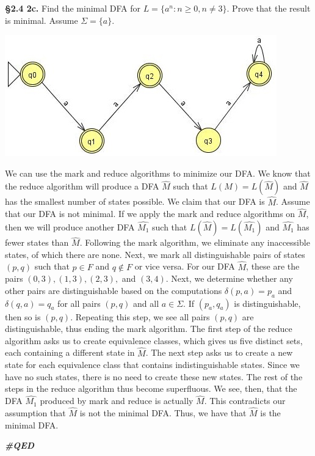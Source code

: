\documentclass[12pt,letter]{article}
\newcommand{\QED}{
	\begin{flushright}
		\textit{\textbf{\#QED}}
	\end{flushright}
}
\begin{document}
\pagebreak


\textbf{\S 2.4 2c.} Find the minimal DFA for $L = \lbrace a^n : n \geq 0, n \neq 3 \rbrace$. Prove that the result is minimal. Assume $\Sigma = \lbrace a \rbrace$.

\begin{center}
	\includegraphics{"images/Lab 2 - 2c"}
\end{center}

We can use the mark and reduce algorithms to minimize our DFA. We know that the reduce algorithm will produce a DFA $\widehat{M}$ such that $L(M) = L(\widehat{M})$ and $\widehat{M}$ has the smallest number of states possible. We claim that our DFA is $\widehat{M}$. Assume that our DFA is not minimal. If we apply the mark and reduce algorithms on $\widehat{M}$, then we will produce another DFA $\widehat{M_1}$ such that $L(\widehat{M}) = L(\widehat{M_1})$ and $\widehat{M_1}$ has fewer states than $\widehat{M}$. Following the mark algorithm, we eliminate any inaccessible states, of which there are none. Next, we mark all distinguishable pairs of states $(p, q)$ such that $p \in F$ and $q \not \in F$ or vice versa. For our DFA $\widehat{M}$, these are the pairs $(0, 3), (1, 3), (2, 3),$ and $(3, 4)$. Next, we determine whether any other pairs are distinguishable based on the computations $\delta (p, a) = p_a$ and $\delta (q, a) = q_a$ for all pairs $(p, q)$ and all $a \in \Sigma$. If $(p_a, q_a)$ is distinguishable, then so is $(p, q)$. Repeating this step, we see all pairs $(p, q)$ are distinguishable, thus ending the mark algorithm. The first step of the reduce algorithm asks us to create equivalence classes, which gives us five distinct sets, each containing a different state in $\widehat{M}$. The next step asks us to create a new state for each equivalence class that contains indistinguishable states. Since we have no such states, there is no need to create these new states. The rest of the steps in the reduce algorithm thus become superfluous. We see, then, that the DFA $\widehat{M_1}$ produced by mark and reduce is actually $\widehat{M}$. This contradicts our assumption that $\widehat{M}$ is not the minimal DFA. Thus, we have  that $\widehat{M}$ is the minimal DFA. \QED
\end{document}
